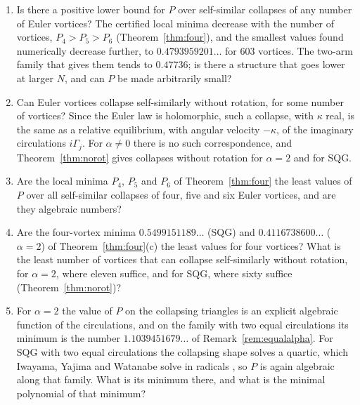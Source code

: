 \documentclass[11pt]{article}
\theoremstyle{definition}
\begin{document}
\begin{enumerate}
\item Is there a positive lower bound for $P$ over self-similar collapses of any number of Euler vortices? The certified local minima decrease with the number of vortices, $P_4 > P_5 > P_6$ (Theorem~\ref{thm:four}), and the smallest values found numerically decrease further, to $0.4793959201\ldots$ for 603 vortices. The two-arm family that gives them tends to $0.47736$; is there a structure that goes lower at larger $N$, and can $P$ be made arbitrarily small?
\item Can Euler vortices collapse self-similarly without rotation, for some number of vortices? Since the Euler law is holomorphic, such a collapse, with $\kappa$ real, is the same as a relative equilibrium, with angular velocity $-\kappa$, of the imaginary circulations $i\Gamma_j$. For $\alpha \ne 0$ there is no such correspondence, and Theorem~\ref{thm:norot} gives collapses without rotation for $\alpha = 2$ and for SQG.
\item Are the local minima $P_4$, $P_5$ and $P_6$ of Theorem~\ref{thm:four} the least values of $P$ over all self-similar collapses of four, five and six Euler vortices, and are they algebraic numbers?
\item Are the four-vortex minima $0.5499151189\ldots$ (SQG) and $0.4116738600\ldots$ ($\alpha = 2$) of Theorem~\ref{thm:four}(c) the least values for four vortices? What is the least number of vortices that can collapse self-similarly without rotation, for $\alpha = 2$, where eleven suffice, and for SQG, where sixty suffice (Theorem~\ref{thm:norot})?
\item For $\alpha = 2$ the value of $P$ on the collapsing triangles is an explicit algebraic function of the circulations, and on the family with two equal circulations its minimum is the number $1.1039451679\ldots$ of Remark~\ref{rem:equalalpha}. For SQG with two equal circulations the collapsing shape solves a quartic, which Iwayama, Yajima and Watanabe solve in radicals \cite[Eqs.~(4.2), (4.3)]{iyw2025}, so $P$ is again algebraic along that family. What is its minimum there, and what is the minimal polynomial of that minimum?
\end{enumerate}
\end{document}
